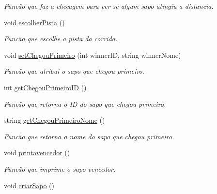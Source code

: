 \begin{DoxyCompactItemize}
\begin{DoxyCompactList}\small\item\em Funcão que faz a checagem para ver se algum sapo atingiu a distancia. \end{DoxyCompactList}\item 
void \hyperlink{classcorrida_a251f5e155036ab1f04490a16ffa68877}{escolher\+Pista} ()\hypertarget{classcorrida_a251f5e155036ab1f04490a16ffa68877}{}\label{classcorrida_a251f5e155036ab1f04490a16ffa68877}

\begin{DoxyCompactList}\small\item\em Funcão que escolhe a pista da corrida. \end{DoxyCompactList}\item 
void \hyperlink{classcorrida_a7af4cd61aec837c53db40119e71005ae}{set\+Chegou\+Primeiro} (int winner\+ID, string winner\+Nome)
\begin{DoxyCompactList}\small\item\em Funcão que atribui o sapo que chegou primeiro. \end{DoxyCompactList}\item 
int \hyperlink{classcorrida_a765818959078576a3d891de925101363}{get\+Chegou\+Primeiro\+ID} ()\hypertarget{classcorrida_a765818959078576a3d891de925101363}{}\label{classcorrida_a765818959078576a3d891de925101363}

\begin{DoxyCompactList}\small\item\em Funcão que retorna o ID do sapo que chegou primeiro. \end{DoxyCompactList}\item 
string \hyperlink{classcorrida_a265441b700e217b2d856e238c15cea0d}{get\+Chegou\+Primeiro\+Nome} ()\hypertarget{classcorrida_a265441b700e217b2d856e238c15cea0d}{}\label{classcorrida_a265441b700e217b2d856e238c15cea0d}

\begin{DoxyCompactList}\small\item\em Funcão que retorna o nome do sapo que chegou primeiro. \end{DoxyCompactList}\item 
void \hyperlink{classcorrida_ac2a0d674899f165d854301e0a06643f1}{printavencedor} ()\hypertarget{classcorrida_ac2a0d674899f165d854301e0a06643f1}{}\label{classcorrida_ac2a0d674899f165d854301e0a06643f1}

\begin{DoxyCompactList}\small\item\em Funcão que imprime o sapo vencedor. \end{DoxyCompactList}\item 
void \hyperlink{classcorrida_af46876f8d0834a581a157f6b7b5f0377}{criar\+Sapo} ()\hypertarget{classcorrida_af46876f8d0834a581a157f6b7b5f0377}{}\label{classcorrida_af46876f8d0834a581a157f6b7b5f0377}


\end{DoxyCompactItemize}
